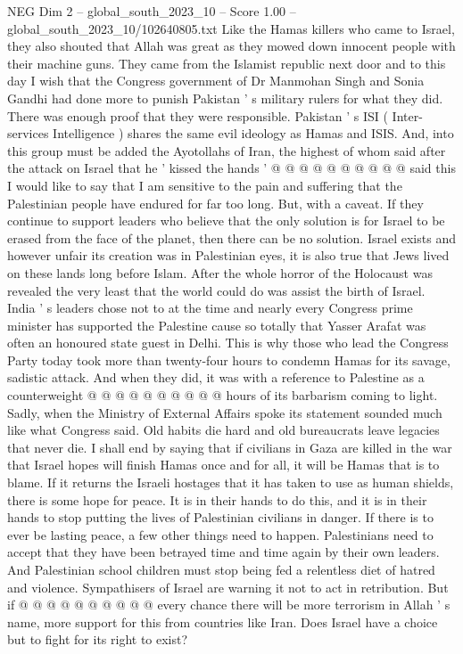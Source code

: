 \begin{textsample}{NEG Dim 2 – global\_south\_2023\_10 – Score 1.00 – global\_south\_2023\_10/102640805.txt}
Like the Hamas killers who came to Israel, they also shouted that Allah was great as they mowed down innocent people with their machine guns.
They came from the Islamist republic next door and to this day I wish that the Congress government of Dr Manmohan Singh and Sonia Gandhi had done more to punish Pakistan ' s military rulers for what they did.
There was enough proof that they were responsible.
Pakistan ' s ISI ( Inter-services Intelligence ) shares the same evil ideology as Hamas and ISIS.
And, into this group must be added the Ayotollahs of Iran, the highest of whom said after the attack on Israel that he ' kissed the hands ' @ @ @ @ @ @ @ @ @ @ said this I would like to say that I am sensitive to the pain and suffering that the Palestinian people have endured for far too long.
But, with a caveat.
If they continue to support leaders who believe that the only solution is for Israel to be erased from the face of the planet, then there can be no solution.
Israel exists and however unfair its creation was in Palestinian eyes, it is also true that Jews lived on these lands long before Islam.
After the whole horror of the Holocaust was revealed the very least that the world could do was assist the birth of Israel.
India ' s leaders chose not to at the time and nearly every Congress prime minister has supported the Palestine cause so totally that Yasser Arafat was often an honoured state guest in Delhi.
This is why those who lead the Congress Party today took more than twenty-four hours to condemn Hamas for its savage, sadistic attack.
And when they did, it was with a reference to Palestine as a counterweight @ @ @ @ @ @ @ @ @ @ hours of its barbarism coming to light.
Sadly, when the Ministry of External Affairs spoke its statement sounded much like what Congress said.
Old habits die hard and old bureaucrats leave legacies that never die.
I shall end by saying that if civilians in Gaza are killed in the war that Israel hopes will finish Hamas once and for all, it will be Hamas that is to blame.
If it returns the Israeli hostages that it has taken to use as human shields, there is some hope for peace.
It is in their hands to do this, and it is in their hands to stop putting the lives of Palestinian civilians in danger.
If there is to ever be lasting peace, a few other things need to happen.
Palestinians need to accept that they have been betrayed time and time again by their own leaders.
And Palestinian school children must stop being fed a relentless diet of hatred and violence.
Sympathisers of Israel are warning it not to act in retribution.
But if @ @ @ @ @ @ @ @ @ @ every chance there will be more terrorism in Allah ' s name, more support for this from countries like Iran.
Does Israel have a choice but to fight for its right to exist?

\end{textsample}
